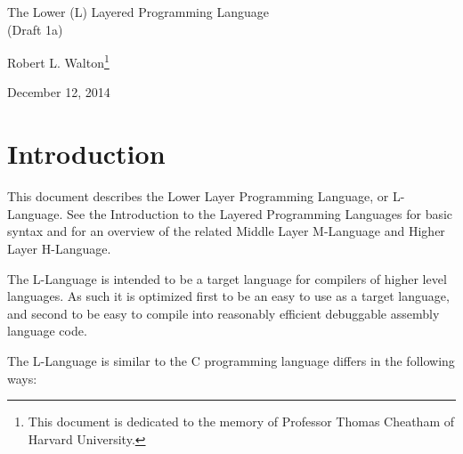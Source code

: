 \documentclass[12pt]{article}
\makeatletter
\renewcommand\tableofcontents{%
    \begin{list}{}%
	     {\setlength{\itemsep}{0in}%
	      \setlength{\topsep}{0in}%
	      \setlength{\parsep}{1ex}%
	      \setlength{\labelwidth}{0in}%
	      \setlength{\baselineskip}{1.5ex}%
	      \setlength{\leftmargin}{1.0in}%
	      \setlength{\rightmargin}{1.0in}}%
    \item\@starttoc{toc}%
    \end{list}}
\makeatother
\begin{document}
        
\begin{center}

{\Large
The Lower (L) Layered Programming Language \\[0.5ex]
(Draft 1a)}

\medskip

Robert L. Walton\footnote{This document is dedicated to the memory
of Professor Thomas Cheatham of Harvard University.}

December 12, 2014
 
\end{center}

{\small \tableofcontents}

\newpage

\section{Introduction}

This document describes the Lower Layer Programming Language, or
L-Language.  See the Introduction to the Layered
Programming Languages for basic syntax and for an overview of the related
Middle Layer M-Language and Higher Layer H-Language.

The L-Language is intended to be a target language for compilers of
higher level languages.  As such it is optimized first to be an easy to 
use as a target language, and second to be easy to
compile into reasonably efficient debuggable assembly language code.

The L-Language is similar to the C programming language
differs in the following ways:
\end{document}
